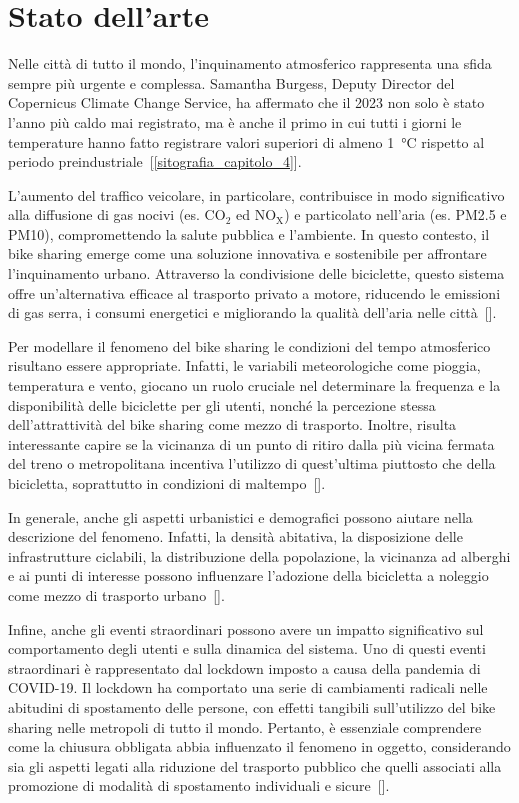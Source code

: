 \section[Stato dell'arte]{Stato dell'arte}
Nelle città di tutto il mondo, l'inquinamento atmosferico rappresenta una sfida sempre più urgente e complessa. Samantha Burgess, Deputy Director del Copernicus Climate Change Service, ha affermato che il 2023 non solo è stato l'anno più caldo mai registrato, ma è anche il primo in cui tutti i giorni le temperature hanno fatto registrare valori superiori di almeno \SI{1}{\degreeCelsius} rispetto al periodo preindustriale~[\ref{sitografia_capitolo_4}].
\par L'aumento del traffico veicolare, in particolare, contribuisce in modo significativo alla diffusione di gas nocivi (es. CO$_2$ ed NO$_\text{X}$) e particolato nell'aria (es. PM\num{2.5} e PM\num{10}), compromettendo la salute pubblica e l'ambiente. In questo contesto, il bike sharing emerge come una soluzione innovativa e sostenibile per affrontare l'inquinamento urbano. Attraverso la condivisione delle biciclette, questo sistema offre un'alternativa efficace al trasporto privato a motore, riducendo le emissioni di gas serra, i consumi energetici e migliorando la qualità dell'aria nelle città~[\cite{paper_bike_sharing_e_ambiente}].
\par Per modellare il fenomeno del bike sharing le condizioni del tempo atmosferico risultano essere appropriate. Infatti, le variabili meteorologiche come pioggia, temperatura e vento, giocano un ruolo cruciale nel determinare la frequenza e la disponibilità delle biciclette per gli utenti, nonché la percezione stessa dell'attrattività del bike sharing come mezzo di trasporto. Inoltre, risulta interessante capire se la vicinanza di un punto di ritiro dalla più vicina fermata del treno o metropolitana incentiva l'utilizzo di quest'ultima piuttosto che della bicicletta, soprattutto in condizioni di maltempo~[\cite{paper_bike_sharing_e_meteo}].
\par In generale, anche gli aspetti urbanistici e demografici possono aiutare nella descrizione del fenomeno. Infatti, la densità abitativa, la disposizione delle infrastrutture ciclabili, la distribuzione della popolazione, la vicinanza ad alberghi e ai punti di interesse possono influenzare l'adozione della bicicletta a noleggio come mezzo di trasporto urbano~[\cite{paper_bike_sharing_e_popolazione}].
\par Infine, anche gli eventi straordinari possono avere un impatto significativo sul comportamento degli utenti e sulla dinamica del sistema. Uno di questi eventi straordinari è rappresentato dal lockdown imposto a causa della pandemia di COVID-\num{19}. Il lockdown ha comportato una serie di cambiamenti radicali nelle abitudini di spostamento delle persone, con effetti tangibili sull'utilizzo del bike sharing nelle metropoli di tutto il mondo. Pertanto, è essenziale comprendere come la chiusura obbligata abbia influenzato il fenomeno in oggetto, considerando sia gli aspetti legati alla riduzione del trasporto pubblico che quelli associati alla promozione di modalità di spostamento individuali e sicure~[\cite{paper_bike_sharing_e_covid}].
